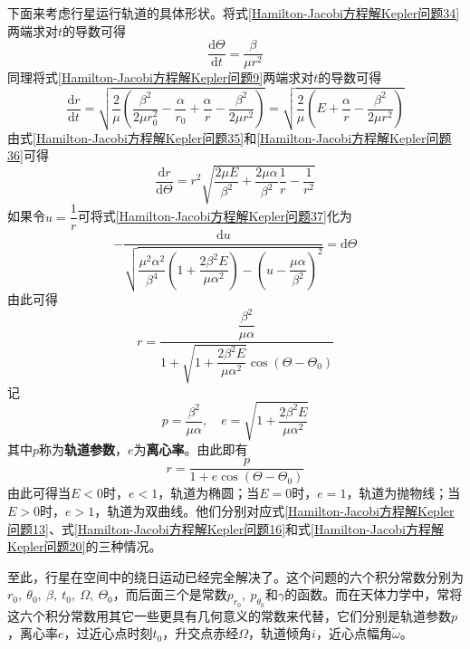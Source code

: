 下面来考虑行星运行轨道的具体形状。将式\eqref{Hamilton-Jacobi方程解Kepler问题34}两端求对$t$的导数可得
\begin{equation}
	\frac{\mathrm{d}\varTheta}{\mathrm{d}t} = \frac{\beta}{\mu r^2}
	\label{Hamilton-Jacobi方程解Kepler问题35}
\end{equation}
同理将式\eqref{Hamilton-Jacobi方程解Kepler问题9}两端求对$t$的导数可得
\begin{equation}
	\frac{\mathrm{d}r}{\mathrm{d}t} = \sqrt{\frac{2}{\mu}\left(\frac{\beta^2}{2\mu r_0^2}-\frac{\alpha}{r_0}+ \frac{\alpha}{r}- \frac{\beta^2}{2\mu r^2}\right)} = \sqrt{\frac{2}{\mu}\left(E+\frac{\alpha}{r}-\frac{\beta^2}{2\mu r^2}\right)}
	\label{Hamilton-Jacobi方程解Kepler问题36}
\end{equation}
由式\eqref{Hamilton-Jacobi方程解Kepler问题35}和\eqref{Hamilton-Jacobi方程解Kepler问题36}可得
\begin{equation}
	\frac{\mathrm{d}r}{\mathrm{d}\varTheta} = r^2\sqrt{\frac{2\mu E}{\beta^2}+ \frac{2\mu\alpha}{\beta^2} \frac1r - \frac{1}{r^2}}
	\label{Hamilton-Jacobi方程解Kepler问题37}
\end{equation}
如果令$u = \dfrac1r$可将式\eqref{Hamilton-Jacobi方程解Kepler问题37}化为
\begin{equation*}
	-\frac{\mathrm{d}u}{\sqrt{\dfrac{\mu^2\alpha^2}{\beta^4}\left(1+\dfrac{2\beta^2E}{\mu\alpha^2}\right) - \left(u - \dfrac{\mu\alpha}{\beta^2}\right)^2}} = \mathrm{d}\varTheta
\end{equation*}
由此可得
\begin{equation*}
	r = \frac{\dfrac{\beta^2}{\mu\alpha}}{1+\sqrt{1+\dfrac{2\beta^2E}{\mu\alpha^2}}\cos(\varTheta-\varTheta_0)}
\end{equation*}
记
\begin{equation}
	p = \dfrac{\beta^2}{\mu\alpha},\quad e = \sqrt{1+\dfrac{2\beta^2E}{\mu\alpha^2}}
	\label{Hamilton-Jacobi方程解Kepler问题38}
\end{equation}
其中$p$称为{\bf 轨道参数}，$e$为{\bf 离心率}。由此即有
\begin{equation}
	r = \frac{p}{1+e\cos(\varTheta-\varTheta_0)}
	\label{Hamilton-Jacobi方程解Kepler问题39}
\end{equation}
由此可得当$E<0$时，$e<1$，轨道为椭圆；当$E=0$时，$e=1$，轨道为抛物线；当$E>0$时，$e>1$，轨道为双曲线。他们分别对应式\eqref{Hamilton-Jacobi方程解Kepler问题13}、式\eqref{Hamilton-Jacobi方程解Kepler问题16}和式\eqref{Hamilton-Jacobi方程解Kepler问题20}的三种情况。

至此，行星在空间中的绕日运动已经完全解决了。这个问题的六个积分常数分别为$r_0,~\theta_0,~\beta,~t_0,~\varOmega,~\varTheta_0$，而后面三个是常数$p_{r_0},~p_{\theta_0}$和$\gamma$的函数。而在天体力学中，常将这六个积分常数用其它一些更具有几何意义的常数来代替，它们分别是轨道参数$p$，离心率$e$，过近心点时刻$t_0$，升交点赤经$\varOmega$，轨道倾角$i$，近心点幅角$\tilde{\omega}$。

